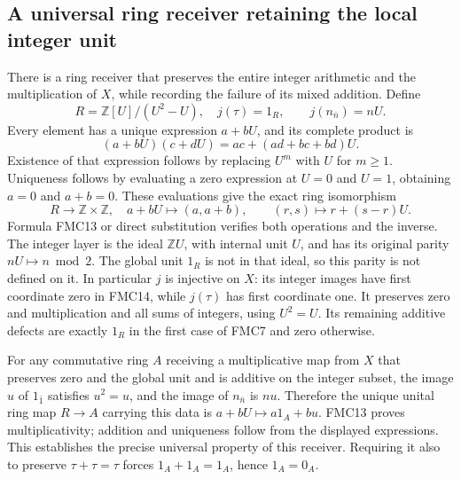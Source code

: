 \subsection{A universal ring receiver retaining the local integer unit}
There is a ring receiver that preserves the entire integer arithmetic
and the multiplication of $X$, while recording the failure of its
mixed addition. Define
\begin{equation}\tag{FMC12}
R=\mathbb Z[U]/(U^2-U),\quad
j(\tau)=1_R,\qquad j(n_{\bar n})=nU.
\end{equation}
Every element has a unique expression $a+bU$, and its complete
product is
\begin{equation}\tag{FMC13}
(a+bU)(c+dU)=ac+(ad+bc+bd)U.
\end{equation}
Existence of that expression follows by replacing $U^m$ with $U$
for $m\ge1$. Uniqueness follows by evaluating a zero expression at
$U=0$ and $U=1$, obtaining $a=0$ and $a+b=0$.
These evaluations give the exact ring isomorphism
\begin{equation}\tag{FMC14}
R\longrightarrow\mathbb Z\times\mathbb Z,\quad
a+bU\longmapsto(a,a+b),\qquad
(r,s)\longmapsto r+(s-r)U.
\end{equation}
Formula FMC13 or direct substitution verifies both operations and
the inverse. The integer layer is the ideal $\mathbb ZU$, with
internal unit $U$, and has its original parity $nU\mapsto n\bmod2$.
The global unit $1_R$ is not in that ideal, so this parity is not
defined on it. In particular $j$ is injective on $X$: its integer
images have first coordinate zero in FMC14, while $j(\tau)$ has
first coordinate one. It preserves zero and multiplication and
all sums of integers, using $U^2=U$. Its remaining additive defects
are exactly $1_R$ in the first case of FMC7 and zero otherwise.

For any commutative ring $A$ receiving a multiplicative map from $X$
that preserves zero and the global unit and is additive on the
integer subset, the image $u$ of $1_{\bar1}$ satisfies $u^2=u$,
and the image of $n_{\bar n}$ is $nu$. Therefore the unique unital
ring map $R\to A$ carrying this data is $a+bU\mapsto a1_A+bu$.
FMC13 proves multiplicativity; addition and uniqueness follow
from the displayed expressions. This establishes the precise
universal property of this receiver. Requiring it also to preserve
$\tau+\tau=\tau$ forces $1_A+1_A=1_A$, hence $1_A=0_A$.

